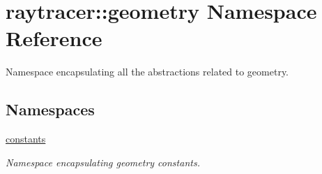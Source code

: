 \hypertarget{namespaceraytracer_1_1geometry}{}\section{raytracer\+:\+:geometry Namespace Reference}
\label{namespaceraytracer_1_1geometry}


Namespace encapsulating all the abstractions related to geometry.  


\subsection*{Namespaces}
\begin{DoxyCompactItemize}
\item 
 \hyperlink{namespaceraytracer_1_1geometry_1_1constants}{constants}
\begin{DoxyCompactList}\small\item\em Namespace encapsulating geometry constants. \end{DoxyCompactList}\end{DoxyCompactItemize}
